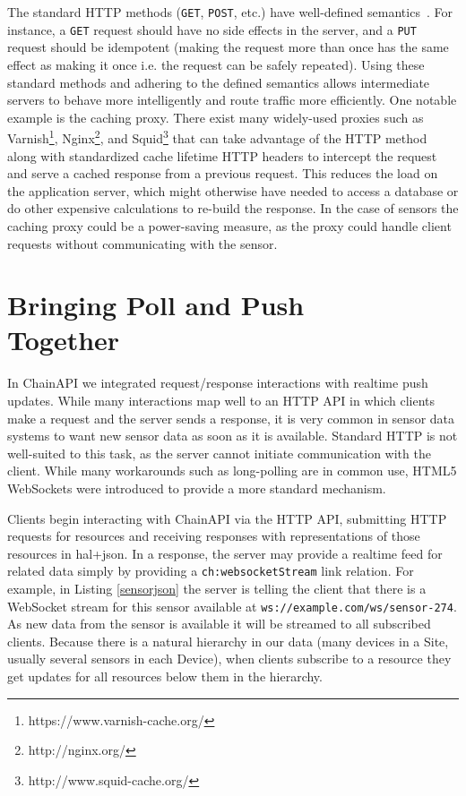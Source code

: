 \documentclass{acm_proc_article-sp}
\begin{document}
The standard HTTP methods (\texttt{GET}, \texttt{POST}, etc.) have well-defined
semantics~\cite{httpmethods}. For instance, a \texttt{GET} request should have
no side effects in the server, and a \texttt{PUT} request should be idempotent
(making the request more than once has the same effect as making it once i.e.
the request can be safely repeated). Using these standard methods and adhering
to the defined semantics allows intermediate servers to behave more
intelligently and route traffic more efficiently. One notable example is the
caching proxy. There exist many widely-used proxies such as
Varnish\footnote{https://www.varnish-cache.org/},
Nginx\footnote{http://nginx.org/}, and
Squid\footnote{http://www.squid-cache.org/} that can take advantage of the HTTP
method along with standardized cache lifetime HTTP headers to intercept the
request and serve a cached response from a previous request. This reduces the
load on the application server, which might otherwise have needed to access a
database or do other expensive calculations to re-build the response. In the
case of sensors the caching proxy could be a power-saving measure, as the proxy
could handle client requests without communicating with the sensor.

\section{Bringing Poll and Push\\ Together}

In ChainAPI we integrated request/response interactions with realtime push
updates. While many interactions map well to an HTTP API in which clients make
a request and the server sends a response, it is very common in sensor data
systems to want new sensor data as soon as it is available.  Standard HTTP is
not well-suited to this task, as the server cannot initiate communication with
the client. While many workarounds such as long-polling are in common use,
HTML5 WebSockets were introduced to provide a more standard mechanism.

Clients begin interacting with ChainAPI via the HTTP API, submitting HTTP
requests for resources and receiving responses with representations of those
resources in hal+json. In a response, the server may provide a realtime feed
for related data simply by providing a \texttt{ch:websocketStream} link
relation. For example, in Listing \ref{sensorjson} the server is telling the
client that there is a WebSocket stream for this sensor available at
\texttt{ws://example.com/ws/sensor-274}. As new data from the sensor is
available it will be streamed to all subscribed clients. Because there is a
natural hierarchy in our data (many devices in a Site, usually several sensors
in each Device), when clients subscribe to a resource they get updates for all
resources below them in the hierarchy.
\end{document}
